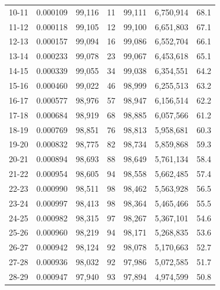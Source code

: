 \documentclass[10pt,a4paper]{article}
\begin{document}
\begin{longtable}{|c|c|c|c|c|c|c|}
10-11  & 0.000109      & 99,116       & 11            & 99,111        & 6,750,914    & 68.1         \\
11-12  & 0.000118      & 99,105       & 12            & 99,100        & 6,651,803    & 67.1         \\
12-13  & 0.000157      & 99,094       & 16            & 99,086        & 6,552,704    & 66.1         \\
13-14  & 0.000233      & 99,078       & 23            & 99,067        & 6,453,618    & 65.1         \\
14-15  & 0.000339      & 99,055       & 34            & 99,038        & 6,354,551    & 64.2         \\
15-16  & 0.000460      & 99,022       & 46            & 98,999        & 6,255,513    & 63.2         \\
16-17  & 0.000577      & 98,976       & 57            & 98,947        & 6,156,514    & 62.2         \\
17-18  & 0.000684      & 98,919       & 68            & 98,885        & 6,057,566    & 61.2         \\
18-19  & 0.000769      & 98,851       & 76            & 98,813        & 5,958,681    & 60.3         \\
19-20  & 0.000832      & 98,775       & 82            & 98,734        & 5,859,868    & 59.3         \\
20-21  & 0.000894      & 98,693       & 88            & 98,649        & 5,761,134    & 58.4         \\
21-22  & 0.000954      & 98,605       & 94            & 98,558        & 5,662,485    & 57.4         \\
22-23  & 0.000990      & 98,511       & 98            & 98,462        & 5,563,928    & 56.5         \\
23-24  & 0.000997      & 98,413       & 98            & 98,364        & 5,465,466    & 55.5         \\
24-25  & 0.000982      & 98,315       & 97            & 98,267        & 5,367,101    & 54.6         \\
25-26  & 0.000960      & 98,219       & 94            & 98,171        & 5,268,835    & 53.6         \\
26-27  & 0.000942      & 98,124       & 92            & 98,078        & 5,170,663    & 52.7         \\
27-28  & 0.000936      & 98,032       & 92            & 97,986        & 5,072,585    & 51.7         \\
28-29  & 0.000947      & 97,940       & 93            & 97,894        & 4,974,599    & 50.8         \\

\end{longtable}
\end{document}
